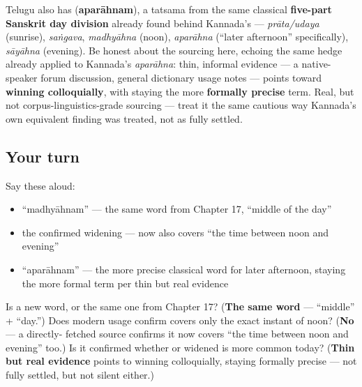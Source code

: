 \begin{cousinweb}
Telugu also has \textbf{} (\textbf{aparāhnam}), a tatsama from the same classical \textbf{five-part Sanskrit day division} already found behind Kannada's \textbf{} — \emph{prāta/udaya} (sunrise), \emph{saṅgava}, \emph{madhyāhna} (noon), \emph{aparāhna} (\textquotedblleft{}later afternoon\textquotedblright{} specifically), \emph{sāyāhna} (evening). Be honest about the sourcing here, echoing the same hedge already applied to Kannada's \emph{aparāhna}: thin, informal evidence — a native-speaker forum discussion, general dictionary usage notes — points toward \textbf{ winning colloquially}, with \textbf{} staying the more \textbf{formally precise} term. Real, but not corpus-linguistics-grade sourcing — treat it the same cautious way Kannada's own equivalent finding was treated, not as fully settled.
\end{cousinweb}

\subsection*{Your turn}
Say these aloud:

\begin{itemize}
\raggedright
  \item \textquotedblleft{}madhyāhnam\textquotedblright{} — the same word from Chapter 17, \textquotedblleft{}middle of the day\textquotedblright{}
  \item the confirmed widening — now also covers \textquotedblleft{}the time between noon and evening\textquotedblright{}
  \item \textquotedblleft{}aparāhnam\textquotedblright{} — the more precise classical word for later afternoon, staying the more formal term per thin but real evidence
\end{itemize}

\begin{tcolorbox}[breakable,colback=teal!4,colframe=teal!35!black,title={Before you move on}]
Is  a new word, or the same one from Chapter 17? (\textbf{The same word} — \textquotedblleft{}middle\textquotedblright{} + \textquotedblleft{}day.\textquotedblright{}) Does modern usage confirm  covers only the exact instant of noon? (\textbf{No} — a directly- fetched source confirms it now covers \textquotedblleft{}the time between noon and evening\textquotedblright{} too.) Is it confirmed whether  or widened  is more common today? (\textbf{Thin but real evidence} points to  winning colloquially,  staying formally precise — not fully settled, but not silent either.)
\end{tcolorbox}
